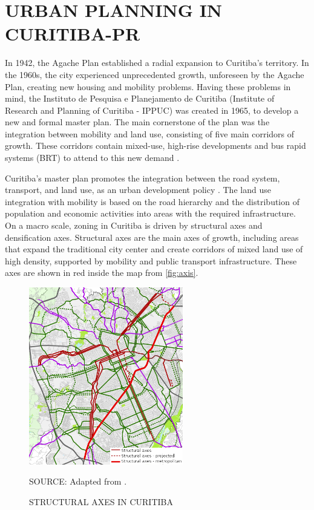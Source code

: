 \section{URBAN PLANNING IN CURITIBA-PR} \label{sec:cwb_be}

In 1942, the Agache Plan established a radial expansion to Curitiba's territory. In the 1960s, the city experienced unprecedented growth, unforeseen by the Agache Plan, creating new housing and mobility problems. Having these problems in mind, the Instituto de Pesquisa e Planejamento de Curitiba (Institute of Research and Planning of Curitiba - IPPUC) was created in 1965, to develop a new and formal master plan. The main cornerstone of the plan was the integration between mobility and land use, consisting of five main corridors of growth. These corridors contain mixed-use, high-rise developments and bus rapid systems (BRT) to attend to this new demand \cite{Rosario2016}. 

Curitiba's master plan promotes the integration between the road system, transport, and land use, as an urban development policy \cite{Curitiba2015}. The land use integration with mobility is based on the road hierarchy and the distribution of population and economic activities into areas with the required infrastructure. On a macro scale, zoning in Curitiba is driven by structural axes and densification axes. Structural axes are the main axes of growth, including areas that expand the traditional city center and create corridors of mixed land use of high density, supported by mobility and public transport infrastructure. These axes are shown in red inside the map from \autoref{fig:axis}. 

\begin{figure}[!htbp]
    \centering\footnotesize
    \captionsetup{font=footnotesize}
    \caption{STRUCTURAL AXES IN CURITIBA}
    \includegraphics[width=0.6\textwidth]{fig/axes2.png}
    \label{fig:axis}
    \par SOURCE: Adapted from \textcite{Curitiba2015}.
\end{figure}

